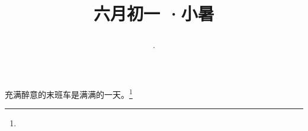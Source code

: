 \title{\date[d=6,m=7,y=2024][year:cn-y,年,month:cn,day:cn,日,·,weekday]·六月初一 ·小暑}
充满醉意的末班车是满满的一天。\footnote{ }

